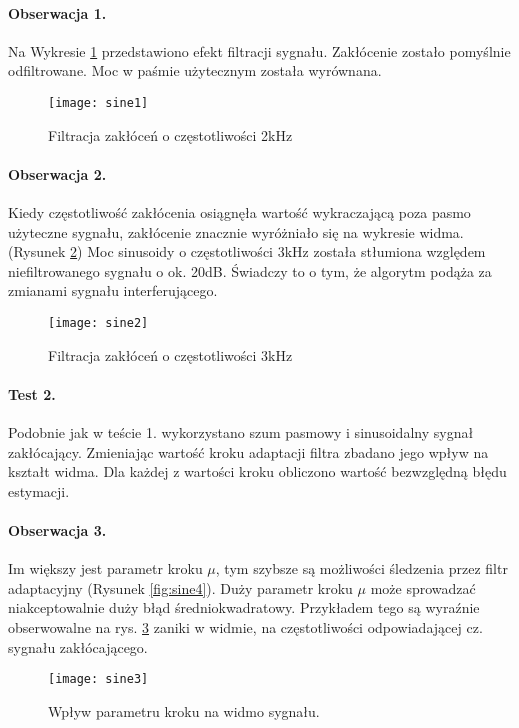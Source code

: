 \paragraph{Obserwacja 1.}
Na Wykresie \ref{fig:sine1} przedstawiono efekt filtracji sygnału.
Zakłócenie  zostało pomyślnie odfiltrowane.
Moc w paśmie użytecznym została wyrównana.

\begin{figure}[h]
\centering
\texttt{[image: sine1]}
\caption{Filtracja zakłóceń o częstotliwości 2kHz}
\label{fig:sine1}
\end{figure}

\paragraph{Obserwacja 2.}
Kiedy częstotliwość zakłócenia osiągnęła wartość wykraczającą poza pasmo użyteczne sygnału, zakłócenie znacznie wyróżniało się na wykresie widma. (Rysunek \ref{fig:sine2})
Moc sinusoidy o częstotliwości 3kHz została stłumiona względem niefiltrowanego sygnału o ok. 20dB.
Świadczy to o tym, że algorytm podąża za zmianami sygnału interferującego.

\begin{figure}[h]
\centering
\texttt{[image: sine2]}
\caption{Filtracja zakłóceń o częstotliwości 3kHz}
\label{fig:sine2}
\end{figure}

\paragraph{Test 2.}
Podobnie jak w teście 1. wykorzystano szum pasmowy i sinusoidalny sygnał zakłócający.
Zmieniając wartość kroku adaptacji filtra zbadano jego wpływ na kształt widma.
Dla każdej z wartości kroku obliczono wartość bezwzględną błędu estymacji.

\paragraph{Obserwacja 3.}
Im większy jest parametr kroku $\mu$, tym szybsze są możliwości śledzenia przez filtr adaptacyjny (Rysunek \ref{fig:sine4}). Duży parametr kroku $\mu$ może sprowadzać niakceptowalnie duży błąd średniokwadratowy. \cite{Haykin:1998:ST} 
Przykładem tego są wyraźnie obserwowalne na rys. \ref{fig:sine3} zaniki w widmie, na częstotliwości odpowiadającej cz. sygnału zakłócającego.

\begin{figure}[h]
\centering
\texttt{[image: sine3]}
\caption{Wpływ parametru kroku na widmo sygnału.}
\label{fig:sine3}
\end{figure}

